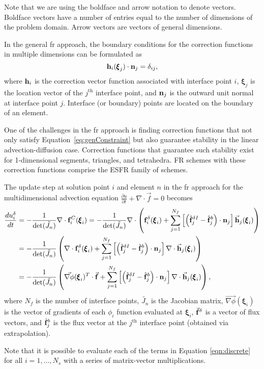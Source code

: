 Note that we are using the boldface and arrow notation to denote vectors. Boldface vectors have a number of entries equal to the number of dimensions of the problem domain. Arrow vectors are vectors of general dimensions.

In the general \gls{fr} approach, the boundary conditions for the correction functions in multiple dimensions can be formulated as
\begin{equation}\label{eq:genConstraint}
{\bf{h}}_i( {\pmb \xi}_j)\cdot {\bf{n}}_j = \delta_{ij},
\end{equation}
where ${\bf{h}}_i$ is the correction vector function associated with interface point $i$, ${\pmb \xi}_j$ is the location vector of the $j^\text{th}$ interface point, and ${\bf{n}}_j$ is the outward unit normal at interface point $j$. Interface (or boundary) points are located on the boundary of an element.

One of the challenges in the \gls{fr} approach is finding correction functions that not only satisfy Equation~\eqref{eq:genConstraint} but also guarantee stability in the linear advection-diffusion case. Correction functions that guarantee such stability exist for 1-dimensional segments\cite{vincent2011new}, triangles\cite{castonguay2012new,williams2013tri}, and tetrahedra\cite{williams2013tet}. FR schemes with these correction functions comprise the ESFR family of schemes.

The update step at solution point $i$ and element $n$ in the \gls{fr} approach for the multidimensional advection equation $\frac{\partial u}{\partial t} + \nabla \cdot \vec{f} = 0$ becomes
\begin{equation}
\label{eqn:discrete}
\begin{split}
\frac{d {u}^\delta_i}{d t} &= - \frac{1}{\text{det}(\tilde{J_n})} \nabla \cdot {\bf f}_i^C({\pmb \xi}_i) = - \frac{1}{\text{det}(\tilde{J_n})} \nabla \cdot \left({\bf f}_i^\delta({\pmb \xi}_i) + \sum^{N_f}_{j = 1} \left[\left( \hat{\bf f}^{\delta I}_j - \hat{\bf f}^b_j \right)\cdot {\bf n}_j \right]\vec{\bf h}_j ({\pmb \xi}_i) \right)\\
&=- \frac{1}{\text{det}(\tilde{J_n})} \left( \nabla \cdot {\bf f}_i^\delta({\pmb \xi}_i) + \sum^{N_f}_{j = 1} \left[\left( \hat{\bf f}^{\delta I}_j - \hat{\bf f}^b_j\right)\cdot {\bf n}_j \right]\nabla \cdot\vec{\bf h}_j ({\pmb \xi}_i)\right)\\
&=- \frac{1}{\text{det}(\tilde{J_n})} \left( \vec{\nabla \phi}({\pmb \xi}_i)^T  \cdot  \vec{\bf f} + \sum^{N_f}_{j = 1} \left[\left( \hat{\bf f}^{\delta I}_j - \hat{\bf f}^b_j\right)\cdot {\bf n}_j \right]\nabla \cdot\vec{\bf h}_j ({\pmb \xi}_i)\right),\\
\end{split}
\end{equation}
where $N_f$ is the number of interface points, $\tilde{J_n}$ is the Jacobian matrix, $\vec{\nabla \phi}({\pmb \xi}_i)$ is the vector of gradients of each $\phi_i$ function evaluated at ${\pmb \xi}_i$, $\vec{\bf f}^\delta$ is a vector of flux vectors, and $\hat{\bf f}^b_j$ is the flux vector at the $j^{\text{th}}$ interface point (obtained via extrapolation).

Note that it is possible to evaluate each of the terms in Equation \eqref{eqn:discrete} for all $i = 1,\dots,N_s$ with a series of matrix-vector multiplications.


